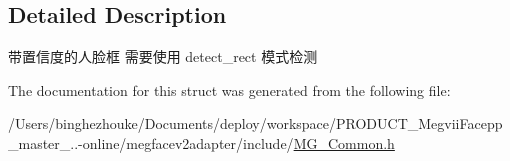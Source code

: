 \subsection{Detailed Description}
带置信度的人脸框 需要使用 detect\+\_\+rect 模式检测 

The documentation for this struct was generated from the following file\+:\begin{DoxyCompactItemize}
\item 
/\+Users/binghezhouke/\+Documents/deploy/workspace/\+P\+R\+O\+D\+U\+C\+T\+\_\+\+Megvii\+Facepp\+\_\+master\+\_..-\/online/megfacev2adapter/include/\hyperlink{_m_g___common_8h}{M\+G\+\_\+\+Common.\+h}\end{DoxyCompactItemize}
